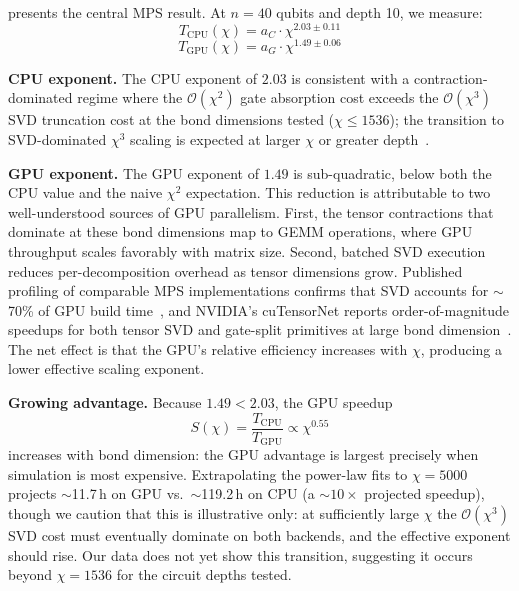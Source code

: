 \documentclass[conference,10pt]{IEEEtran}
\begin{document}
 presents the central MPS result. At $n = 40$ qubits and depth 10, we measure:
\begin{equation}
    T_{\text{CPU}}(\chi) = a_{C} \cdot \chi^{2.03 \pm 0.11}
\end{equation}
\begin{equation}
    T_{\text{GPU}}(\chi) = a_{G} \cdot \chi^{1.49 \pm 0.06}
\end{equation}

\textbf{CPU exponent.} The CPU exponent of $2.03$ is consistent with a contraction-dominated regime where the $\mathcal{O}(\chi^2)$ gate absorption cost exceeds the $\mathcal{O}(\chi^3)$ SVD truncation cost at the bond dimensions tested ($\chi \leq 1536$); the transition to SVD-dominated $\chi^3$ scaling is expected at larger $\chi$ or greater depth~\cite{schollwock2011density}.

\textbf{GPU exponent.} The GPU exponent of $1.49$ is sub-quadratic, below both the CPU value and the naive $\chi^{2}$ expectation. This reduction is attributable to two well-understood sources of GPU parallelism. First, the tensor contractions that dominate at these bond dimensions map to GEMM operations, where GPU throughput scales favorably with matrix size. Second, batched SVD execution reduces per-decomposition overhead as tensor dimensions grow. Published profiling of comparable MPS implementations confirms that SVD accounts for $\sim$70\% of GPU build time~\cite{schieffer2025harnessingcudaqsmpstensor}, and NVIDIA's cuTensorNet reports order-of-magnitude speedups for both tensor SVD and gate-split primitives at large bond dimension~\cite{bayraktar2023cuquantum}. The net effect is that the GPU's relative efficiency increases with $\chi$, producing a lower effective scaling exponent.

\textbf{Growing advantage.} Because $1.49 < 2.03$, the GPU speedup
\begin{equation}
    S(\chi) = \frac{T_\text{CPU}}{T_{\text{GPU}}} \propto \chi^{0.55}
\end{equation}
increases with bond dimension: the GPU advantage is largest precisely when simulation is most expensive. Extrapolating the power-law fits to $\chi = 5000$ projects $\sim$11.7\,h on GPU vs.\ $\sim$119.2\,h on CPU (a $\sim$$10\times$ projected speedup), though we caution that this is illustrative only: at sufficiently large $\chi$ the $\mathcal{O}(\chi^3)$ SVD cost must eventually dominate on both backends, and the effective exponent should rise. Our data does not yet show this transition, suggesting it occurs beyond $\chi = 1536$ for the circuit depths tested.
 
\end{document}
